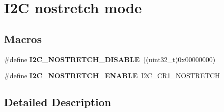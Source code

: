 \hypertarget{group___i2_c__nostretch__mode}{}\section{I2C nostretch mode}
\label{group___i2_c__nostretch__mode}
\subsection*{Macros}
\begin{DoxyCompactItemize}
\item 
\#define {\bfseries I2\+C\+\_\+\+N\+O\+S\+T\+R\+E\+T\+C\+H\+\_\+\+D\+I\+S\+A\+B\+LE}~((uint32\+\_\+t)0x00000000)\hypertarget{group___i2_c__nostretch__mode_ga611deefe89e56fa65f853e6796f2cf66}{}\label{group___i2_c__nostretch__mode_ga611deefe89e56fa65f853e6796f2cf66}

\item 
\#define {\bfseries I2\+C\+\_\+\+N\+O\+S\+T\+R\+E\+T\+C\+H\+\_\+\+E\+N\+A\+B\+LE}~\hyperlink{group___peripheral___registers___bits___definition_ga197aaca79f64e832af3a0a0864c2a08c}{I2\+C\+\_\+\+C\+R1\+\_\+\+N\+O\+S\+T\+R\+E\+T\+CH}\hypertarget{group___i2_c__nostretch__mode_ga67ebace1182d99bb5d7968994c01c80e}{}\label{group___i2_c__nostretch__mode_ga67ebace1182d99bb5d7968994c01c80e}

\end{DoxyCompactItemize}


\subsection{Detailed Description}
